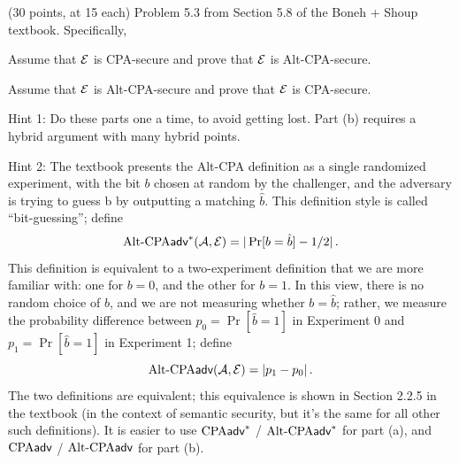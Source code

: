 \documentclass[12pt]{article}
\theoremstyle{plain}
\theoremstyle{definition}
\begin{document}
\begin{problem} (30 points, at 15 each) 
Problem 5.3 from Section 5.8 of the Boneh + Shoup textbook. Specifically,

\begin{ppart}
Assume that $\mathcal{E}$ is CPA-secure and prove that $\mathcal{E}$ is Alt-CPA-secure.
\end{ppart}

\begin{ppart}
Assume that $\mathcal{E}$ is Alt-CPA-secure and prove that $\mathcal{E}$ is CPA-secure.
\end{ppart}


Hint 1: Do these parts one a time, to avoid getting lost. Part (b) requires a hybrid argument with many hybrid points.

Hint 2: The textbook presents the Alt-CPA definition as a single randomized experiment, with the bit $b$ chosen at random by the challenger, and the adversary is trying to guess b by outputting a matching $\hat b$. This definition style is called ``bit-guessing''; define 
\[
\textrm{Alt-CPA}\textsf{adv}^*(\mathcal{A}, \mathcal{E})=|\Pr[b=\hat b]-1/2|\,.
\]
This definition is equivalent to a two-experiment definition that we are more familiar with: one for $b=0$, and the other for $b=1$. In this view, there is no random choice of $b$, and we are not measuring whether $b=\hat b$; rather, we measure the probability difference between $p_0=\Pr[\hat b = 1]$ in Experiment $0$ and $p_1=\Pr[\hat b = 1]$ in Experiment 1; define 
\[
\textrm{Alt-CPA}\textsf{adv}(\mathcal{A}, \mathcal{E})=|p_1-p_0|\,.
\]
The two definitions are equivalent; this equivalence is shown in Section 2.2.5 in the textbook (in the context of semantic security, but it's the same for all other such definitions). It is easier to use $\textrm{CPA}\textsf{adv}^*$ / $\textrm{Alt-CPA}\textsf{adv}^*$ for part (a),  and $\textrm{CPA}\textsf{adv}$ / $\textrm{Alt-CPA}\textsf{adv}$ for part (b).
\end{problem}
\end{document}
